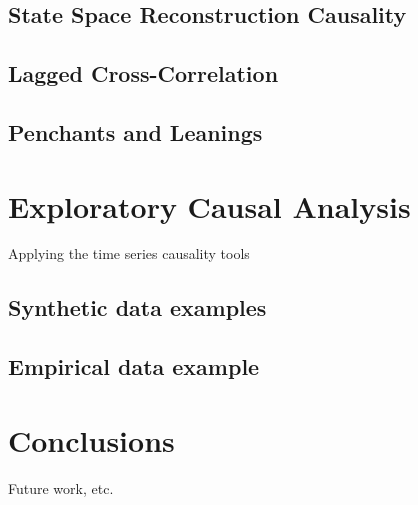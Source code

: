\documentclass{article}[10pt]
\begin{document}
\subsection{State Space Reconstruction Causality}
\subsection{Lagged Cross-Correlation}
\subsection{Penchants and Leanings}

\section{Exploratory Causal Analysis} 
Applying the time series causality tools
\subsection{Synthetic data examples}
\subsection{Empirical data example}

\section{Conclusions} 
Future work, etc.\



\end{document}
